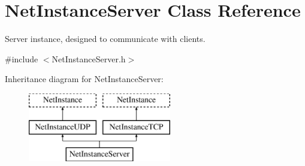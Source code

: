 \hypertarget{class_net_instance_server}{
\section{NetInstanceServer Class Reference}
\label{class_net_instance_server}
}


Server instance, designed to communicate with clients.  




{\ttfamily \#include $<$NetInstanceServer.h$>$}

Inheritance diagram for NetInstanceServer:\begin{figure}[H]
\begin{center}
\leavevmode
\includegraphics[height=3.000000cm]{class_net_instance_server}
\end{center}
\end{figure}
